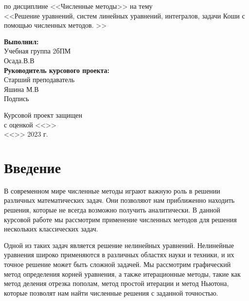 \documentclass[12pt]{article}
\begin{document}
\begin{titlepage}
\begin{center}
        по дисциплине <<Численные методы>>
        на тему\\
        <<Решение уравнений, систем линейных уравнений, интегралов, задачи Коши с помощью численных методов. >>
   \end{center}
   
    \hfill \begin{minipage}{0.5\linewidth}
        \textbf{Выполнил:}\\
        Учебная группа 2бПМ\\
        Осада.В.В\\
        \textbf{Руководитель курсового проекта:
        }\\
        Старший преподаватель\\
       Яшина М.В\\
        Подпись \underline{\hspace{1cm}}\\
    \end{minipage}
    \vspace{1 cm}
   \begin{minipage}{0.45\linewidth}
        Курсовой проект защищен\\ с оценкой <<\underline{\hspace{1cm}}>>\\
        <<\underline{\hspace{0.7cm}}>> \underline{\hspace{2cm}} 2023 г.
    \end{minipage}
    \begin{minipage}{0.55\linewidth}
    \end{minipage}
    \vspace{5 cm}
\end{titlepage}

\tableofcontents
\newpage

\section{Введение}
В современном мире численные методы играют важную роль в решении различных математических задач. Они позволяют нам приближенно находить решения, которые не всегда возможно получить аналитически. В данной курсовой работе мы рассмотрим применение численных методов для решения нескольких классических задач.

Одной из таких задач является решение нелинейных уравнений. Нелинейные уравнения широко применяются в различных областях науки и техники, и их точное решение может быть сложной задачей. Мы рассмотрим графический метод определения корней уравнения, а также итерационные методы, такие как метод деления отрезка пополам, метод простой итерации и метод Ньютона, которые позволят нам найти численные решения с заданной точностью.
\end{document}
